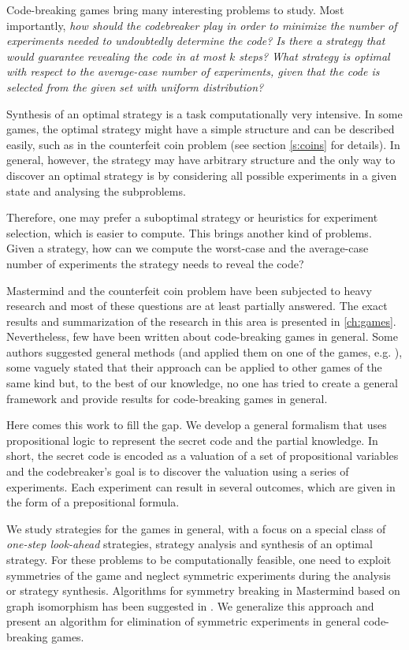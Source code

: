 Code-breaking games bring many interesting problems to study.
Most importantly,
 \emph{how should the codebreaker play in order to minimize the number of experiments
   needed to undoubtedly determine the code?}
 \emph{Is there a strategy that would guarantee
   revealing the code in at most $k$ steps?}
 \emph{What strategy is optimal with respect
   to the average-case number of experiments,
   given that the code is selected
   from the given set with uniform distribution?}

Synthesis of an optimal strategy is a task computationally very intensive.
In some games, the optimal strategy might have a simple
  structure and can be described easily, such as in
  the counterfeit coin problem (see section \autoref{s:coins} for details).
In general, however, the strategy may have arbitrary structure and the only way
  to discover an optimal strategy is by considering all possible experiments
  in a given state and analysing the subproblems.

Therefore, one may prefer a suboptimal strategy or heuristics
  for experiment selection,
  which is easier to compute.
This brings another kind of problems.
Given a strategy,
  how can we compute the worst-case and the average-case number
  of experiments the strategy needs to reveal the code?

Mastermind and the counterfeit coin problem have been subjected to
heavy research and most of these questions are at least partially answered.
The exact results and summarization of the research in this area is presented
  in \autoref{ch:games}.
Nevertheless, few have been written about code-breaking games in general.
Some authors suggested general methods (and applied them on one of the games,
  e.g. \cite{cbg-stgopt, cbg-gen}),
  some vaguely stated that their approach can be applied
  to other games of the same kind but,
  to the best of our knowledge, no one has tried to
  create a general framework and provide
   results for code-breaking games in general.

Here comes this work to fill the gap.
We develop a general formalism that uses propositional logic to
  represent the secret code and the partial knowledge.
In short, the secret code is encoded as a valuation of
  a set of propositional variables
  and the codebreaker's goal is to discover the valuation
  using a series of experiments.
Each experiment can result in several outcomes,
  which are given in the form of a prepositional formula.

We study strategies for the games in general, with a focus on
  a special class of \emph{one-step look-ahead} strategies,
  strategy analysis and synthesis of an optimal strategy.
For these problems to be computationally feasible, one need to exploit
  symmetries of the game and neglect symmetric experiments during the analysis
  or strategy synthesis.
Algorithms for symmetry breaking in Mastermind
  based on graph isomorphism has been suggested in \cite{cbg-nauty}.
We generalize this approach and present
  an algorithm for elimination of symmetric experiments
  in general code-breaking games.

